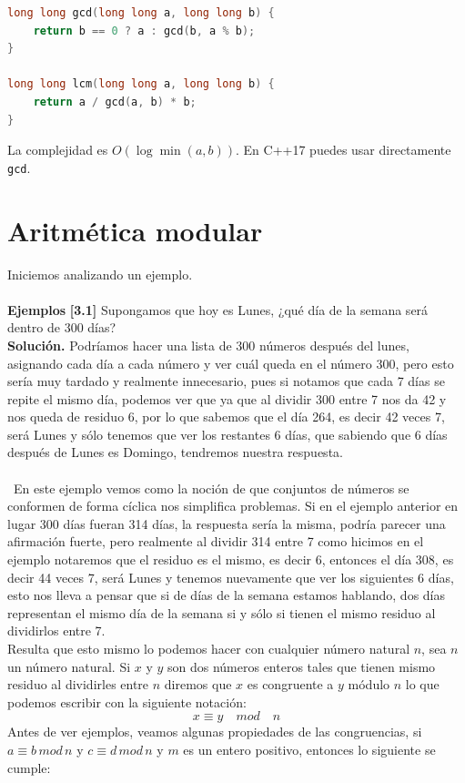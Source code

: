 \begin{lstlisting}[language=C++]
long long gcd(long long a, long long b) {
    return b == 0 ? a : gcd(b, a % b);
}
 
long long lcm(long long a, long long b) {
    return a / gcd(a, b) * b;
}
\end{lstlisting}
 
La complejidad es $O(\log \min(a,b))$. En C++17 puedes usar directamente \texttt{gcd}.
\section{Aritmética modular}
Iniciemos analizando un ejemplo.
\\\\
\textbf{Ejemplos}
\textbf{[3.1] }Supongamos que hoy es Lunes, ¿qué día de la semana será dentro de 300 días?
\\
\textbf{Solución.} Podríamos hacer una lista de 300 números después del lunes, asignando cada día a cada número y ver cuál queda en el número 300, pero esto sería muy tardado y realmente innecesario, pues si notamos que cada 7 días se repite el mismo día, podemos ver que ya que al dividir 300 entre 7 nos da 42 y nos queda de residuo 6, por lo que sabemos que el día 264, es decir 42 veces 7, será Lunes y sólo tenemos que ver los restantes 6 días, que sabiendo que 6 días después de Lunes es Domingo, tendremos nuestra respuesta.
\\\\\
En este ejemplo vemos como la noción de que conjuntos de números se conformen de forma cíclica nos simplifica problemas. Si en el ejemplo anterior en lugar 300 días fueran 314 días, la respuesta sería la misma, podría parecer una afirmación fuerte, pero realmente al dividir 314 entre 7 como hicimos en el ejemplo notaremos que el residuo es el mismo, es decir 6, entonces el día 308, es decir 44 veces 7, será Lunes y tenemos nuevamente que ver los siguientes 6 días, esto nos lleva a pensar que si de días de la semana estamos hablando, dos días representan el mismo día de la semana si y sólo si tienen el mismo residuo al dividirlos entre 7.
\\Resulta que esto mismo lo podemos hacer con cualquier número natural $n$, sea $n$ un número natural. Si $x$ y $y$ son dos números enteros tales que tienen mismo residuo al dividirles entre $n$ diremos que $x$ es congruente a $y$ módulo $n$ lo que podemos escribir con la siguiente notación:
\[x \equiv y \quad mod \quad n\]
Antes de ver ejemplos, veamos algunas propiedades de las congruencias, si $a\equiv b \, mod \, n$ y $c\equiv d \, mod \, n$ y $m$ es un entero positivo, entonces lo siguiente se cumple:
